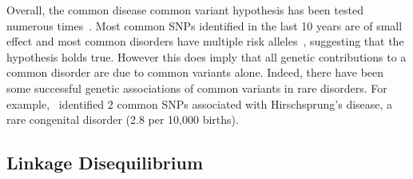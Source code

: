 Overall, the common disease common variant hypothesis has been tested numerous times~\cite{Bush2012}.
Most common SNPs identified in the last 10 years are of small effect and most common disorders have multiple risk alleles~\cite{Welter2014,Schork2010}, suggesting that the hypothesis holds true. 
However this does imply that all genetic contributions to a common disorder are due to common variants alone.
Indeed, there have been some successful genetic associations of common variants in rare disorders.
For example,~\cite{Garcia-Barcelo2009a} identified 2 common SNPs associated with Hirschsprung's disease, a rare congenital disorder (2.8 per 10,000 births).

\subsection{Linkage Disequilibrium}
\label{sub:linkage_disequilibrium}

